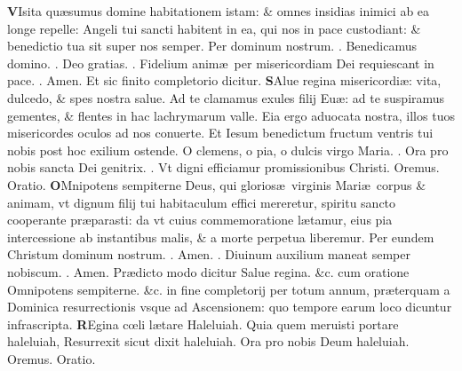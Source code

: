 \documentclass[a5paper,10pt]{book}
\def\ae{æ}
\def\oe{œ}
\begin{document}
\begin{multicols*}{2}
\vspace{-.25em}
\lettrine[lines=2]{\bfseries \color{red} V}{}Isita qu\ae sumus domine habitationem istam: \& omnes insidias inimici ab ea longe repelle: Angeli tui sancti habitent in ea, qui nos in pace custodiant: \& benedictio tua sit super nos semper. Per dominum nostrum. \color{red} \Vbar . \color{black} Benedicamus domino. \color{red} \Rbar . \color{black} Deo gratias. \color{red} \Vbar . \color{black} Fidelium anim\ae \ per misericordiam Dei requiescant in pace. \color{red} \Rbar . \color{black} Amen. 
\newline \color{red} Et sic finito completorio dicitur. \color{black}
\vspace{-.25em}
\lettrine[lines=2]{\bfseries \color{red} S}{}Alue regina misericordi\ae : vita, dulcedo, \& spes nostra salue. Ad te clamamus exules filij Eu\ae : ad te suspiramus gementes, \&  flentes in hac lachrymarum valle. Eia ergo aduocata nostra, illos tuos misericordes oculos ad nos conuerte. Et Iesum benedictum fructum ventris tui nobis post hoc exilium ostende. O clemens, o pia, o dulcis virgo Maria. \color{red} \Vbar . \color{black} Ora pro nobis sancta Dei genitrix. \color{red} \Rbar . \color{black} Vt digni efficiamur promissionibus Christi. \color{red} O\color{black}remus. \color{red} Oratio. \color{black}
\vspace{-.25em}
\lettrine[lines=2]{\bfseries \color{red} O}{}Mnipotens sempiterne Deus, qui glorios\ae \ virginis Mari\ae \ corpus \& animam, vt dignum filij tui habitaculum effici mereretur, spiritu sancto
cooperante pr\ae parasti: da vt cuius commemoratione l\ae tamur, eius pia intercessione ab instantibus malis, \& a morte perpetua liberemur. Per eundem Christum dominum nostrum. \color{red} \Rbar . \color{black} Amen. \Vbar . %
Diuinum auxilium maneat semper nobiscum. \color{red} \Rbar . \color{black} Amen.
\newline {} \color{red} Pr\ae dicto modo dicitur \color{black} Salue regina. \color{red} \&c. cum oratione \color{black} Omnipotens sempiterne. \&c. \color{red} in fine completorij per totum annum, pr\ae terquam a Dominica resurrectionis vsque ad Ascensionem: quo tempore earum loco dicuntur infrascripta. \color{black}
\vspace{-.25em}
\lettrine[lines=2]{\bfseries \color{red} R}{}Egina c\oe li l\ae tare Haleluiah. Quia quem meruisti portare haleluiah, Resurrexit sicut dixit haleluiah. Ora pro nobis Deum haleluiah. Oremus. \color{red} O\color{black}ratio.
\vspace{-.25em}

\end{multicols*}
\end{document}
